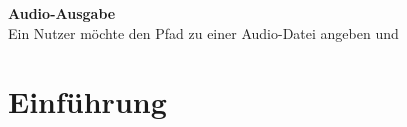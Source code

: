 \documentclass[11pt,a4paper]{report}
\begin{document}
\textbf{Audio-Ausgabe}\\
Ein Nutzer möchte den Pfad zu einer Audio-Datei angeben und





\chapter{Einführung} \label{chap:einfuehrung}

\end{document}
